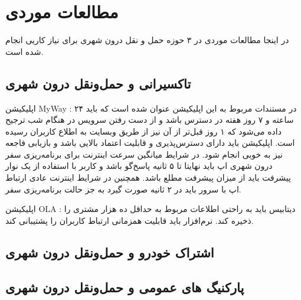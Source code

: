 \section{مطالعات موردی}

در اینجا مطالعات موردی در ۳ حوزه حمل و نقل درون شهری برای نیاز کاریی انجام شده است. 
\subsection{تاکسیرانی و حمل‌و‌نقل درون شهری}

اپلیکیشن MyWay : در مستندات مربوط به این اپلیکیشن عنوان شده است که باید ۲۴ ساعته و ۷ روز هفته در دسترس باشد و از دست رفتن سرویس در هنگام شب ترجیح داده می‌شود که ۱ روز قبل‌تر از آن نیز از طریق وبسایت به اطلاع کاربران رسیده است. 
اپلیکیشن باید دارای دسترس‌پذیری و قابلیت اعتماد بالایی باشد و بازیابی فاجعه نیز به خوبی انجام شود. در شرایط میانگین سرعت اینترنت برای برنامه‌ریزی سفر درون شهری اپ باید نهایتا تا ۵ ثانیه پاسخ‌گو باشد و کاربر با استفاده از یک نوار پیشرفت باید از میزان پیشرفت مطلع باشد. 
همچنین در شرایط اینترنت عادی ارتباط اپ با سرور باید در ۲ ثانیه صورت گیرد به جز حالت برنامه‌ریزی سفر. 

اپلیکیشن OLA : دیتابیس باید به راحتی اطلاعات مربوط به حداقل ده هزار مشتری را ذخیره کند. نرم‌افزار باید قابلیت همزمانی ارتباط کاربران را پشتیبانی کند.

\subsection{اشتراک خودرو و حمل‌و‌نقل درون شهری}


\subsection{پارکنیگ های عمومی و حمل‌و‌نقل درون شهری}





